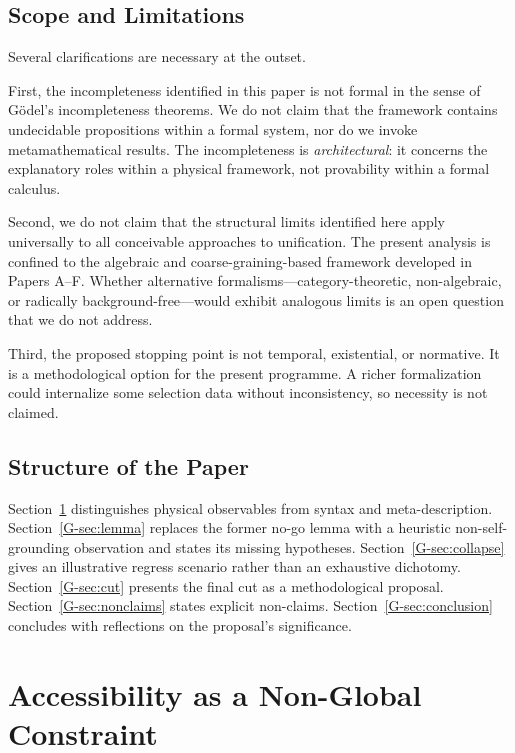 \documentclass[12pt,a4paper,openany]{book}
\begin{document}
\subsection{Scope and Limitations}

Several clarifications are necessary at the outset.

First, the incompleteness identified in this paper is not formal in the sense of G\"{o}del's incompleteness theorems. We do not claim that the framework contains undecidable propositions within a formal system, nor do we invoke metamathematical results. The incompleteness is \emph{architectural}: it concerns the explanatory roles within a physical framework, not provability within a formal calculus.

Second, we do not claim that the structural limits identified here apply universally to all conceivable approaches to unification. The present analysis is confined to the algebraic and coarse-graining-based framework developed in Papers A--F. Whether alternative formalisms---category-theoretic, non-algebraic, or radically background-free---would exhibit analogous limits is an open question that we do not address.

Third, the proposed stopping point is not temporal, existential, or normative.  It is a methodological option for the present programme.  A richer formalization could internalize some selection data without inconsistency, so necessity is not claimed.

\subsection{Structure of the Paper}

Section~\ref{G-sec:accessibility} distinguishes physical observables from syntax and meta-description. Section~\ref{G-sec:lemma} replaces the former no-go lemma with a heuristic non-self-grounding observation and states its missing hypotheses. Section~\ref{G-sec:collapse} gives an illustrative regress scenario rather than an exhaustive dichotomy. Section~\ref{G-sec:cut} presents the final cut as a methodological proposal. Section~\ref{G-sec:nonclaims} states explicit non-claims. Section~\ref{G-sec:conclusion} concludes with reflections on the proposal's significance.

\section{Accessibility as a Non-Global Constraint}
\label{G-sec:accessibility}
\end{document}
